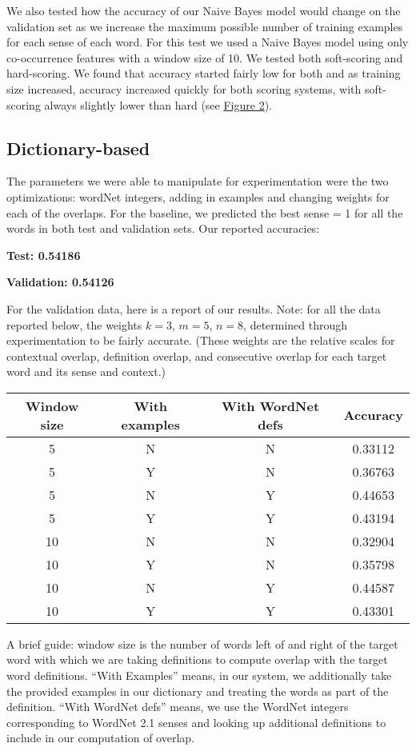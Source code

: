 \documentclass{article}
\begin{document}
We also tested how the accuracy of our Naive Bayes model would change on the validation set as we increase the maximum possible number of training examples for each sense of each word. For this test we used a Naive Bayes model using only co-occurrence features with a window size of 10. We tested both soft-scoring and hard-scoring. We found that accuracy started fairly low for both and as training size increased, accuracy increased quickly for both scoring systems, with soft-scoring always slightly lower than hard (see \hyperref[fig:size]{Figure 2}).

\subsection{Dictionary-based}

The parameters we were able to manipulate for experimentation were the two optimizations: wordNet integers, adding in examples and changing weights for each of the overlaps. For the baseline, we predicted the best sense = 1 for all the words in both test and validation sets. Our reported accuracies:\par
\textbf{Test: 0.54186}\par
\textbf{Validation: 0.54126}\par

For the validation data, here is a report of our results. Note: for all the data reported below, the weights $k = 3$, $m = 5$, $n = 8$, determined through experimentation to be fairly accurate. (These weights are the relative scales for contextual overlap, definition overlap, and consecutive overlap for each target word and its sense and context.)

{\footnotesize\begin{tabular}{|c|c|c|c|}\hline
Window size & With examples & With WordNet defs & Accuracy\\\hline
5 & N & N & 0.33112\\
5 & Y & N & 0.36763\\
5 & N & Y & 0.44653\\
5 & Y & Y & 0.43194\\\hline
10 & N & N & 0.32904\\
10 & Y & N & 0.35798\\
10 & N & Y & 0.44587\\
10 & Y & Y & 0.43301\\\hline
\end{tabular}}

A brief guide: window size is the number of words left of and right of the target word with which we are taking definitions to compute overlap with the target word definitions. ``With Examples'' means, in our system, we additionally take the provided examples in our dictionary and treating the words as part of the definition. ``With WordNet defs'' means, we use the WordNet integers corresponding to WordNet 2.1 senses and looking up additional definitions to include in our computation of overlap.
\end{document}
